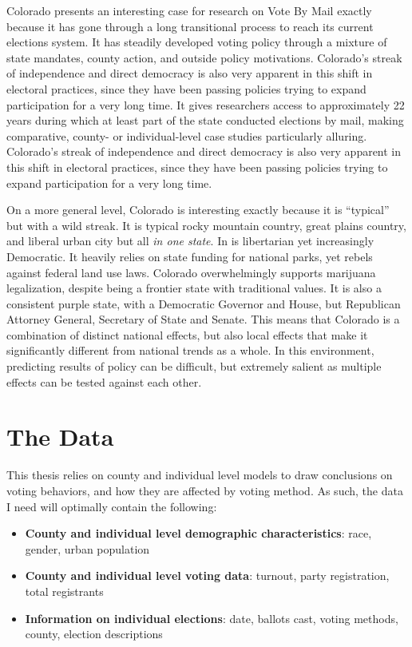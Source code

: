 \documentclass[12pt,twoside]{reedthesis}
\begin{document}
  Colorado presents an interesting case for research on Vote By Mail
  exactly because it has gone through a long transitional process to reach
  its current elections system. It has steadily developed voting policy
  through a mixture of state mandates, county action, and outside policy
  motivations. Colorado's streak of independence and direct democracy is
  also very apparent in this shift in electoral practices, since they have
  been passing policies trying to expand participation for a very long
  time. It gives researchers access to approximately 22 years during which
  at least part of the state conducted elections by mail, making
  comparative, county- or individual-level case studies particularly
  alluring. Colorado's streak of independence and direct democracy is also
  very apparent in this shift in electoral practices, since they have been
  passing policies trying to expand participation for a very long time.
  
  On a more general level, Colorado is interesting exactly because it is
  ``typical'' but with a wild streak. It is typical rocky mountain
  country, great plains country, and liberal urban city but all \emph{in
  one state}. In is libertarian yet increasingly Democratic. It heavily
  relies on state funding for national parks, yet rebels against federal
  land use laws. Colorado overwhelmingly supports marijuana legalization,
  despite being a frontier state with traditional values. It is also a
  consistent purple state, with a Democratic Governor and House, but
  Republican Attorney General, Secretary of State and Senate. This means
  that Colorado is a combination of distinct national effects, but also
  local effects that make it significantly different from national trends
  as a whole. In this environment, predicting results of policy can be
  difficult, but extremely salient as multiple effects can be tested
  against each other.
  
  \section{The Data}\label{the-data}
  
  This thesis relies on county and individual level models to draw
  conclusions on voting behaviors, and how they are affected by voting
  method. As such, the data I need will optimally contain the following:
  
  \begin{itemize}
  \item
    \textbf{County and individual level demographic characteristics}:
    race, gender, urban population
  \item
    \textbf{County and individual level voting data}: turnout, party
    registration, total registrants
  \item
    \textbf{Information on individual elections}: date, ballots cast,
    voting methods, county, election descriptions
  \end{itemize}
  
\end{document}
